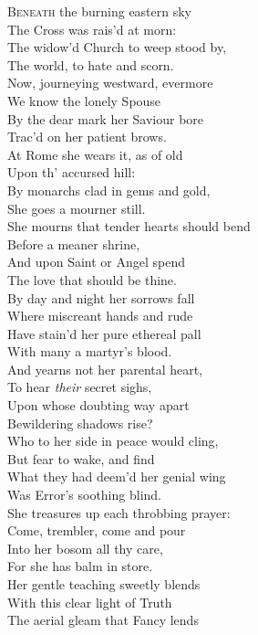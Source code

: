 \textsc{Beneath} the burning eastern sky \\
 The Cross was rais’d at morn: \\
 The widow’d Church to weep stood by, \\
 The world, to hate and scorn. \\
  Now, journeying westward, evermore \\
 We know the lonely Spouse \\
 By the dear mark her Saviour bore \\
 Trac’d on her patient brows. \\
  At Rome she wears it, as of old \\
 Upon th’ accursed hill: \\
 By monarchs clad in gems and gold, \\
 She goes a mourner still. \\
  She mourns that tender hearts should bend \\
 Before a meaner shrine, \\
 And upon Saint or Angel spend \\
 The love that should be thine. \\
  By day and night her sorrows fall \\
 Where miscreant hands and rude \\
 Have stain’d her pure ethereal pall \\
 With many a martyr’s blood. \\
  And yearns not her parental heart, \\
 To hear \emph{their} secret sighs, \\
 Upon whose doubting way apart \\
 Bewildering shadows rise? \\
  Who to her side in peace would cling, \\
 But fear to wake, and find \\
 What they had deem’d her genial wing \\
 Was Error’s soothing blind. \\
  She treasures up each throbbing prayer: \\
 Come, trembler, come and pour \\
 Into her bosom all thy care, \\
 For she has balm in store. \\
  Her gentle teaching sweetly blends \\
 With this clear light of Truth \\
 The aerial gleam that Fancy lends \\
